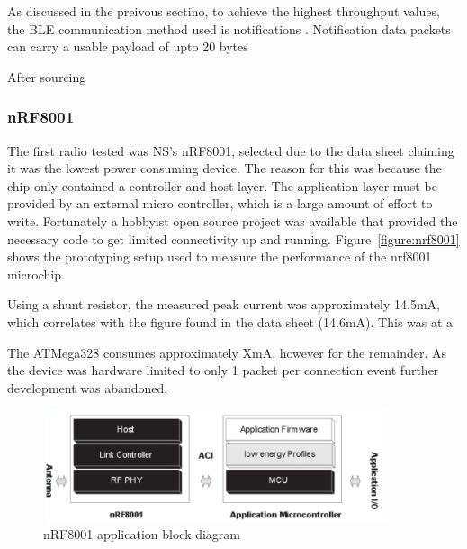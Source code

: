 \documentclass[]{article}
\begin{document}
{As discussed in the preivous sectino, to achieve the highest throughput values, the \ac{BLE} communication method used is notifications . Notification data packets can carry a usable payload of upto 20 bytes

After sourcing


\subsubsection{nRF8001}
The first radio tested was \ac{NS}'s nRF8001, selected due to the data sheet claiming it was the lowest power consuming device. The reason for this was because the chip only contained a controller and host layer. The application layer must be provided by an external micro controller, which is a large amount of effort to write. Fortunately a hobbyist open source project\cite{Guan2013} was available that provided the necessary code to get limited connectivity up and running. Figure~\ref{figure:nrf8001} shows the prototyping setup used to measure the performance of the nrf8001 microchip. 

Using a shunt resistor, the measured peak current was approximately 14.5mA, which correlates with the figure found in the data sheet (14.6mA). This was at a 

The ATMega328 consumes approximately XmA, however for the remainder. As the device was hardware limited to only 1 packet per connection event further development was abandoned.

\begin{figure}[h]
	\begin{center}
		\includegraphics[width = 0.9\textwidth]{nrf8001stack}
	\end{center}
	\caption{nRF8001 application block diagram }
	\label{fig:nrf8001stack}
\end{figure}


}
\end{document}
